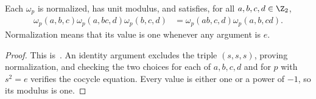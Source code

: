 \begin{lemma}
    \label{thm:asymex_z2_properties}
    \leanok
    Each $\omega_p$ is normalized, has unit modulus, and satisfies,
    for all $a,b,c,d\in\Z_2$,
    \begin{align}
        \omega_p(a,b,c)\omega_p(a,bc,d)\omega_p(b,c,d)
         & =\omega_p(ab,c,d)\omega_p(a,b,cd).
    \end{align}
    Normalization means that its value is one whenever any argument is $e$.
\end{lemma}
\begin{proof}
    \leanok
    This is~\cite[``Normalization, cocycle equation, and unit
        modulus'']{QICLean2026Blueprint}.
    An identity argument excludes the triple $(s,s,s)$, proving
    normalization, and checking the two choices for each of $a,b,c,d$
    and for $p$ with $s^2=e$ verifies the cocycle equation.
    Every value is either one or a power of $-1$, so its modulus is one.
\end{proof}

